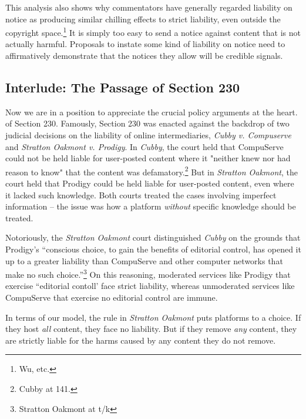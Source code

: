 This analysis also shows why commentators have generally regarded liability on notice as producing similar chilling effects to strict liability, even outside the copyright space.\footnote{Wu, etc.} It is simply too easy to send a notice against content that is not actually harmful. Proposals to instate some kind of liability on notice need to affirmatively demonstrate that the notices they allow will be credible signals.


\subsection{Interlude: The Passage of Section 230}
\label{sec:passage}

Now we are in a position to appreciate the crucial policy arguments at the heart. of Section 230. Famously, Section 230 was enacted against the backdrop of two judicial decisions on the liability of online intermediaries, \emph{Cubby v. Compuserve} and \emph{Stratton Oakmont v. Prodigy}. In \emph{Cubby}, the court held that CompuServe could not be held liable for user-posted content where it "neither knew nor had reason to know" that the content was defamatory.\footnote{Cubby at 141.} But in \emph{Stratton Oakmont}, the court held that Prodigy could be held liable for user-posted content, even where it lacked such knowledge. Both courts treated the cases involving imperfect information -- the issue was how a platform \emph{without} specific knowledge should be treated.

Notoriously, the \emph{Stratton Oakmont} court distinguished \emph{Cubby} on the grounds that Prodigy's ``conscious choice, to gain the benefits of editorial control, has opened it up to a greater liability than CompuServe and other computer networks that make no such choice.''\footnote{Stratton Oakmont at t/k} On this reasoning, moderated services like Prodigy that exercise ``editorial contoll' face strict liability, whereas unmoderated services like CompuServe that exercise no editorial control are immune.

In terms of our model, the rule in \emph{Stratton Oakmont} puts platforms to a choice. If they host \emph{all} content, they face no liability. But if they remove \emph{any} content, they are strictly liable for the harms caused by any content they do not remove.  

